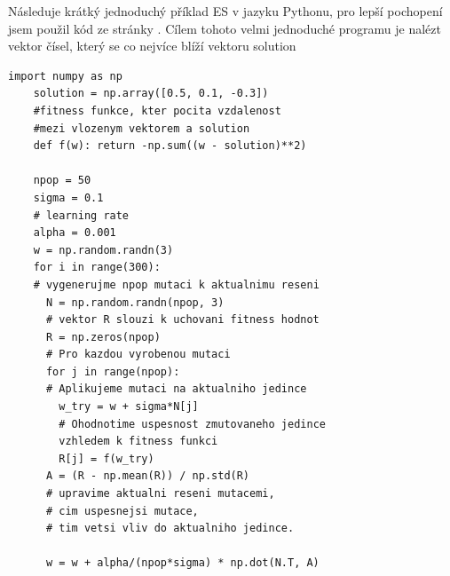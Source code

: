   Následuje krátký jednoduchý příklad ES v jazyku Pythonu, pro lepší pochopení jsem použil kód ze stránky \citep{openAiEs}. Cílem tohoto velmi jednoduché programu je nalézt vektor čísel, který se co nejvíce blíží vektoru solution
  \lstset{language=Python}
  \begin{lstlisting}[frame=single]  % Start your code-block
    import numpy as np
    solution = np.array([0.5, 0.1, -0.3])
    #fitness funkce, kter pocita vzdalenost
    #mezi vlozenym vektorem a solution 
    def f(w): return -np.sum((w - solution)**2)
    
    npop = 50     
    sigma = 0.1    
    # learning rate
    alpha = 0.001  
    w = np.random.randn(3)
    for i in range(300): 
    # vygenerujme npop mutaci k aktualnimu reseni
      N = np.random.randn(npop, 3) 
      # vektor R slouzi k uchovani fitness hodnot
      R = np.zeros(npop) 
      # Pro kazdou vyrobenou mutaci
      for j in range(npop): 
      # Aplikujeme mutaci na aktualniho jedince
        w_try = w + sigma*N[j]
        # Ohodnotime uspesnost zmutovaneho jedince 
        vzhledem k fitness funkci
        R[j] = f(w_try) 
      A = (R - np.mean(R)) / np.std(R) 
      # upravime aktualni reseni mutacemi, 
      # cim uspesnejsi mutace, 
      # tim vetsi vliv do aktualniho jedince.

      w = w + alpha/(npop*sigma) * np.dot(N.T, A)  
     \end{lstlisting}
